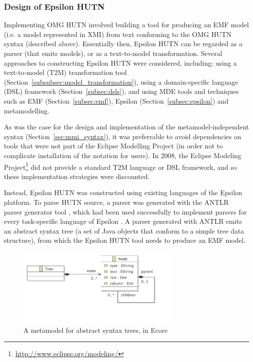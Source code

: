 \subsubsection{Design of Epsilon HUTN}
Implementing OMG HUTN involved building a tool for producing an EMF model (i.e. a model represented in XMI) from text conforming to the OMG HUTN syntax (described above). Essentially then, Epsilon HUTN can be regarded as a parser (that emits models), or as a text-to-model transformation. Several approaches to constructing Epsilon HUTN were considered, including: using a text-to-model (T2M) transformation tool (Section~\ref{subsubsec:model_transformation}), using a domain-specific language (DSL) framework (Section~\ref{subsec:dsls}), and using MDE tools and techniques such as EMF (Section~\ref{subsec:emf}), Epsilon (Section~\ref{subsec:epsilon}) and metamodelling.

As was the case for the design and implementation of the metamodel-independent syntax (Section~\ref{sec:mmi_syntax}), it was preferrable to avoid dependencies on tools that were not part of the Eclipse Modelling Project (in order not to complicate installation of the notation for users). In 2008, the Eclipse Modeling Project\footnote{\url{http://www.eclipse.org/modeling/}} did not provide a standard T2M language or DSL framework, and so these implementation strategies were discounted.

Instead, Epsilon HUTN was constructed using existing languages of the Epsilon platform. To parse HUTN source, a parser was generated with the ANTLR parser generator tool \cite{parr07antlr}, which had been used successfully to implement parsers for every task-specific language of Epsilon \cite{kolovos09thesis}. A parser generated with ANTLR emits an abstract syntax tree (a set of Java objects that conform to a simple tree data structure), from which the Epsilon HUTN tool needs to produce an EMF model.

\begin{figure}[htbp]
  \centering
  \includegraphics[width=8cm]{5.Implementation/images/ast_metamodel.pdf}
  \caption{A metamodel for abstract syntax trees, in Ecore}
  \label{fig:ast_metamodel}
\end{figure}

